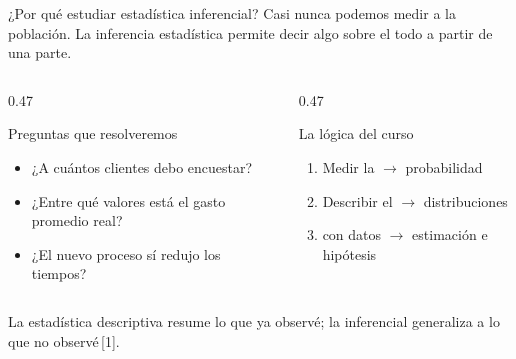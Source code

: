 \documentclass[aspectratio=169,10pt]{beamer}
\begin{document}
\begin{frame}{¿Por qué estudiar estadística inferencial?}
  Casi nunca podemos medir a  la población. La inferencia
  estadística permite decir algo sobre el todo a partir de una parte.

  \vspace{0.35cm}
  \begin{columns}[T,onlytextwidth]
    \begin{column}{0.47\textwidth}
      \begin{block}{Preguntas que resolveremos}
        \begin{itemize}
          \item ¿A cuántos clientes debo encuestar?
          \item ¿Entre qué valores está el gasto promedio real?
          \item ¿El nuevo proceso sí redujo los tiempos?
        \end{itemize}
      \end{block}
    \end{column}
    \begin{column}{0.47\textwidth}
      \begin{exampleblock}{La lógica del curso}
        \begin{enumerate}
          \item Medir la  $\rightarrow$ probabilidad
          \item Describir el  $\rightarrow$ distribuciones
          \item {} con datos $\rightarrow$ estimación e hipótesis
        \end{enumerate}
      \end{exampleblock}
    \end{column}
  \end{columns}

  \vspace{0.3cm}
  {\small\color{uniGris} La estadística descriptiva resume lo que ya observé;
  la inferencial generaliza a lo que no observé\,[1].}
\end{frame}
\end{document}
